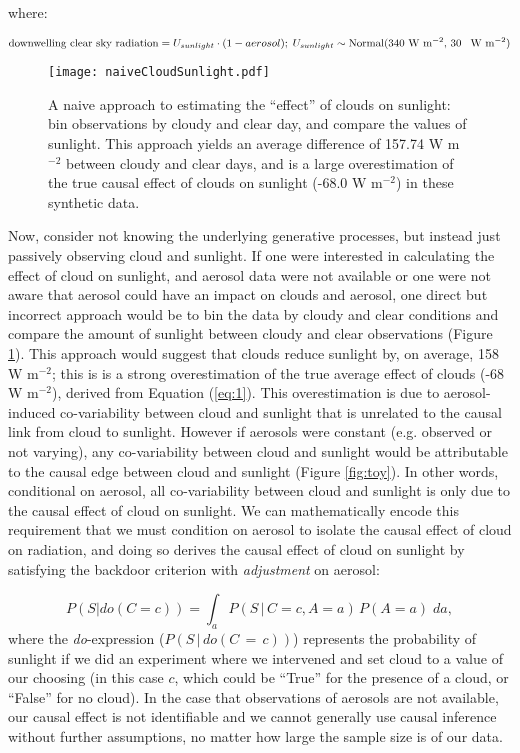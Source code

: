 \documentclass[12pt]{article}
\begin{document}
where:

\begin{equation*} \text{downwelling clear sky radiation} =
  U_{sunlight} \cdot (1 - aerosol); \; U_{sunlight} \sim
  \text{Normal(340 W m$^{-2}$, 30 \, W m$^{-2}$)}
\end{equation*}

\begin{figure} \centering \texttt{[image: naiveCloudSunlight.pdf]}
  \caption{A naive approach to estimating the ``effect'' of clouds on
    sunlight: bin observations by cloudy and clear day, and compare the
    values of sunlight. This approach yields an average difference of
    157.74 W m$^{-2}$ between cloudy and clear days, and is a large
    overestimation of the true causal effect of clouds on sunlight (-68.0
    W m$^{-2}$) in these synthetic data.}
  \label{fig:naive-cloud-sunlight}
\end{figure}

Now, consider not knowing the underlying generative processes, but
instead just passively observing cloud and sunlight. If one were
interested in calculating the effect of cloud on sunlight, and aerosol
data were not available or one were not aware that aerosol could have
an impact on clouds and aerosol, one direct but incorrect approach
would be to bin the data by cloudy and clear conditions and compare
the amount of sunlight between cloudy and clear observations (Figure
\ref{fig:naive-cloud-sunlight}). This approach would suggest that
clouds reduce sunlight by, on average, 158 W m$^{-2}$; this is is a
strong overestimation of the true average effect of clouds (-68 W
m$^{-2}$), derived from Equation (\ref{eq:1}). This overestimation is
due to aerosol-induced co-variability between cloud and sunlight that
is unrelated to the causal link from cloud to sunlight. However if
aerosols were constant (e.g. observed or not varying), any
co-variability between cloud and sunlight would be attributable to the
causal edge between cloud and sunlight (Figure \ref{fig:toy}). In
other words, conditional on aerosol, all co-variability between cloud
and sunlight is only due to the causal effect of cloud on sunlight.
We can mathematically encode this requirement that we must condition
on aerosol to isolate the causal effect of cloud on radiation, and
doing so derives the causal effect of cloud on sunlight by
satisfying the backdoor criterion with \textit{adjustment} on aerosol:

\begin{equation} P(S | do(C = c)) = \int_{a} P(S \, | \, C = c, A=a)
  \, P(A=a) \; da,
  \label{eq:3}
\end{equation} where the \textit{do}-expression ($P(S \, | \, do(C\, = \,c))$) represents the probability of sunlight
if we did an experiment where we intervened and set cloud to a value
of our choosing (in this case $c$, which could be ``True'' for the
presence of a cloud, or ``False'' for no cloud). In the case that observations of aerosols are not available, our causal effect is not identifiable and
we cannot generally use causal inference without further assumptions,
no matter how large the sample size is of our data.
\end{document}

